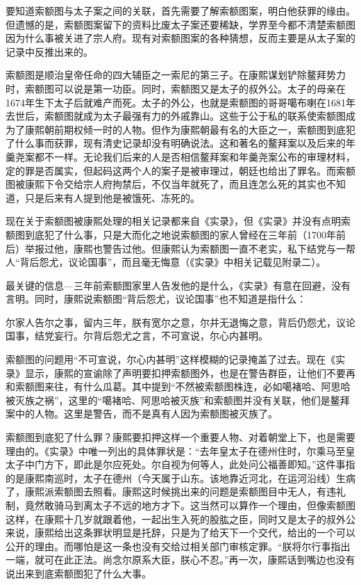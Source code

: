 
要知道索额图与太子案之间的关联，首先需要了解索额图案，明白他获罪的缘由。但遗憾的是，索额图案留下的资料比废太子案还要稀缺，学界至今都不清楚索额图因为什么事被关进了宗人府。现有对索额图案的各种猜想，反而主要是从太子案的记录中反推出来的。



索额图是顺治皇帝任命的四大辅臣之一索尼的第三子。在康熙谋划铲除鳌拜势力时，索额图可以说是第一功臣。同时，索额图又是太子的叔外公。太子的母亲在1674年生下太子后就难产而死。太子的外公，也就是索额图的哥哥噶布喇在1681年去世后，索额图就成为太子最强有力的外戚靠山。这些于公于私的联系使索额图成为了康熙朝前期权倾一时的人物。但作为康熙朝最有名的大臣之一，索额图到底犯了什么事而获罪，现有清史记录却没有明确说法。这和著名的鳌拜案以及后来的年羹尧案都不一样。无论我们后来的人是否相信鳌拜案和年羹尧案公布的审理材料，定的罪是否属实，但起码这两个人的案子是被审理过，朝廷也给出了罪名。而索额图被康熙下令交给宗人府拘禁后，不仅当年就死了，而且连怎么死的其实也不知道，只是后来有人提到他是被饿死、冻死的。



现在关于索额图被康熙处理的相关记录都来自《实录》，但《实录》并没有点明索额图到底犯了什么事，只是大而化之地说索额图的家人曾经在三年前（1700年前后）举报过他，康熙也警告过他。但康熙认为索额图一直不老实，私下结党与一帮人“背后怨尤，议论国事”，而且毫无悔意（《实录》中相关记载见附录二）。



最关键的信息—三年前索额图家里人告发他的是什么，《实录》有意在回避，没有言明。同时，康熙说索额图“背后怨尤，议论国事”也不知道是指什么：



\begin{bookquote}尔家人告尔之事，留内三年，朕有宽尔之意，尔并无退悔之意，背后仍怨尤，议论国事，结党妄行。尔背后怨尤之言，不可宣说，尔心内甚明。\end{bookquote}


索额图的问题用“不可宣说，尔心内甚明”这样模糊的记录掩盖了过去。现在《实录》显示，康熙的宣谕除了声明要扣押索额图外，也是在警告群臣，让他们不要再和索额图来往，有什么瓜葛。其中提到“不然被索额图株连，必如噶褚哈、阿思哈被灭族之祸”，这里的“噶褚哈、阿思哈被灭族”和索额图并没有关联，他们是鳌拜案中的人物。这里是警告，而不是真有人因为索额图被灭族了。



索额图到底犯了什么罪？康熙要扣押这样一个重要人物、对着朝堂上下，也是需要理由的。《实录》中唯一列出的具体罪状是：“去年皇太子在德州住时，尔乘马至皇太子中门方下，即此是尔应死处。尔自视为何等人，此处问公福善即知。”这件事指的是康熙南巡时，太子在德州（今天属于山东。该地靠近河北，在运河沿线）生病了，康熙派索额图去照看。康熙这时候挑出来的问题是索额图目中无人，有违礼制，竟然敢骑马到离太子不远的地方才下。这当然可以算作一个理由，但像索额图这样，在康熙十几岁就跟着他，一起出生入死的股肱之臣，同时又是太子的叔外公来说，康熙给出这条罪状明显是托辞，只是为了给天下一个交代，给出的一个可以公开的理由。而哪怕是这一条也没有交给过相关部门审核定罪。“朕将尔行事指出一端，就可在此正法。尚念尔原系大臣，朕心不忍。”再一次，康熙话到嘴边也没有说出来到底索额图犯了什么大事。


